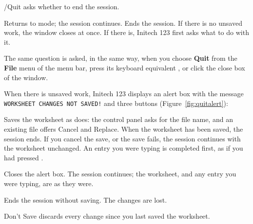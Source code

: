 /Quit asks whether to end the session.
\begin{Options}
 Returns to  mode; the session continues.
 Ends the session.  If there is no unsaved work, the window
  closes at once.  If there is, Initech 123 first asks what to do with it.
\end{Options}

The same question is asked, in the same way, when you choose \textbf{Quit}
from the \textbf{File} menu of the menu bar, press its keyboard equivalent
, or click the close box of the window.


When there is unsaved work, Initech 123 displays an alert box with the
message \texttt{WORKSHEET CHANGES NOT SAVED!} and three buttons
(Figure~\ref{fig:quitalert}):
\begin{Options}
\item[\normalfont\bfseries Save\hfill] Saves the worksheet as
   does: the control panel asks for the file name, and
  an existing file offers Cancel and Replace.  When the worksheet has been
  saved, the session ends.  If you cancel the save, or the save fails, the
  session continues with the worksheet unchanged.  An entry you were typing
  is completed first, as if you had pressed .
\item[\normalfont\bfseries Cancel\hfill] Closes the alert box.  The session
  continues; the worksheet, and any entry you were typing, are as they
  were.
\item[\normalfont\bfseries Don't Save\hfill] Ends the session without
  saving.  The changes are lost.
\end{Options}

\begin{Caution}
Don't Save discards every change since you last saved the worksheet.
\end{Caution}
